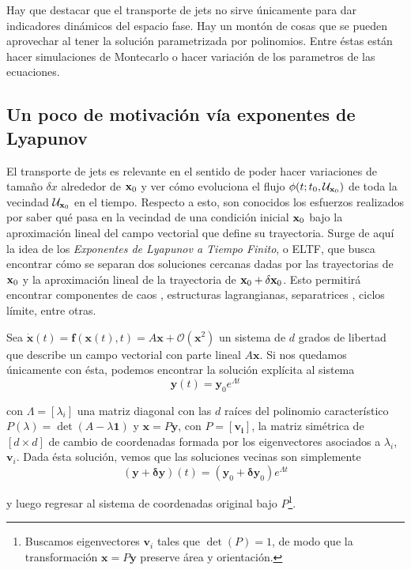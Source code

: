 Hay que destacar que el transporte de jets no sirve únicamente para dar indicadores dinámicos del espacio fase. Hay un montón de cosas que se pueden aprovechar al tener la solución parametrizada por polinomios. Entre éstas están hacer simulaciones de Montecarlo o hacer variación de los parametros de las ecuaciones.

\subsection{Un poco de motivación vía exponentes de Lyapunov}

El transporte de jets es relevante en el sentido de poder hacer variaciones de tamaño $\delta x$ alrededor de $\mathbf{x}_0$ y ver cómo evoluciona el flujo $\phi(t;t_0,\mathcal{U}_{\mathbf{x}_0} )$ de toda la vecindad $\mathcal{U}_{\mathbf{x}_0}$ en el tiempo. Respecto a esto, son conocidos los esfuerzos realizados por saber qué pasa en la vecindad de una condición inicial $\mathbf{x}_0$ bajo la aproximación lineal del campo vectorial que define su trayectoria. Surge de aquí la idea de los \textit{Exponentes de Lyapunov a Tiempo Finito}, o ELTF, que busca encontrar cómo se separan dos soluciones cercanas dadas por las trayectorias de $\mathbf{x}_0$ y la aproximación lineal de la trayectoria de $\mathbf{x}_0 + \delta\mathbf{x}_0$. Esto permitirá encontrar componentes de caos \cite{Perez2015}, estructuras lagrangianas, separatrices \cite{Perez2015}, ciclos límite, entre otras. 

Sea $\dot{\mathbf{x}}(t) = \mathbf{f}(\mathbf{x}(t),t) = A\mathbf{x}+\mathcal{O}(\mathbf{x}^2)$ un sistema de $d$ grados de libertad que describe un campo vectorial con parte lineal $A \mathbf{x}$. Si nos quedamos únicamente con ésta, podemos encontrar la solución explícita al sistema
\begin{equation*}
 \mathbf{y}(t) = \mathbf{y}_0 e^{\Lambda t}
\end{equation*}

con $\Lambda = [\lambda_i]$ una matriz diagonal con las $d$ raíces del polinomio característico $P(\lambda) = \det(A - \lambda \mathbf{1})$ y $\mathbf{x} = P \mathbf{y}$, con $P = [\mathbf{v_i}]$, la matriz simétrica de $[d \times d]$ de cambio de coordenadas formada por los eigenvectores asociados a $\lambda_i$, $\mathbf{v}_i$.
Dada ésta solución, vemos que las soluciones vecinas son simplemente 
\begin{equation*}
 (\mathbf{y} + \mathbf{\delta y})(t) = (\mathbf{y}_0 + \mathbf{\delta y}_0) e^{\Lambda t}
\end{equation*}

y luego regresar al sistema de coordenadas original bajo $P$\footnote{Buscamos eigenvectores $\mathbf{v}_i$ tales que $\det(P) = 1$, de modo que la transformación $\mathbf{x} = P \mathbf{y}$ preserve área y orientación.}. 

